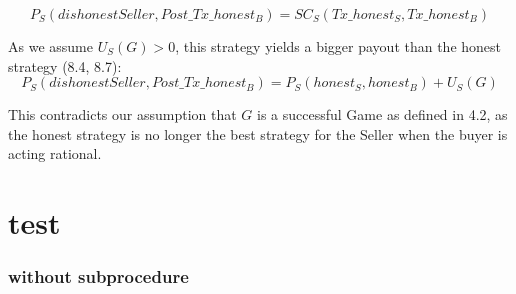 \documentclass{cacthesis}
\begin{document}
\begin{equation}
    P_S(dishonestSeller,Post\_Tx\_honest_B) = SC_S(Tx\_honest_S,Tx\_honest_B)
\end{equation}

As we assume $U_S(G) > 0$, this strategy yields a bigger payout than the honest strategy (8.4, 8.7):
\[P_S(dishonestSeller,Post\_Tx\_honest_B) = P_S(honest_S,honest_B) + U_S(G)\]

This contradicts our assumption that $G$ is a successful Game as defined in 4.2, as the honest strategy is no longer the best strategy for the Seller when the buyer is acting rational.

\chapter{test}
\subsection{without subprocedure}
\end{document}
